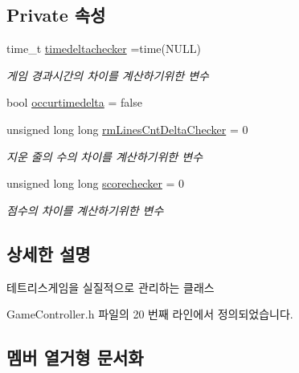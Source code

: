 \subsection*{Private 속성}
\begin{DoxyCompactItemize}
\item 
time\+\_\+t \hyperlink{class_tetris_1_1_game_controller_a41b29ef9d04dcdc824e144a8a2cab543}{timedeltachecker} =time(N\+U\+LL)
\begin{DoxyCompactList}\small\item\em 게임 경과시간의 차이를 계산하기위한 변수 \end{DoxyCompactList}\item 
bool \hyperlink{class_tetris_1_1_game_controller_ac98e5fa60bd5bc9bb2e2c5210148f2cc}{occurtimedelta} = false
\item 
unsigned long long \hyperlink{class_tetris_1_1_game_controller_a090fe0dc93a5f3579714346c4ba39bcd}{rm\+Lines\+Cnt\+Delta\+Checker} = 0
\begin{DoxyCompactList}\small\item\em 지운 줄의 수의 차이를 계산하기위한 변수 \end{DoxyCompactList}\item 
unsigned long long \hyperlink{class_tetris_1_1_game_controller_a2982c5246ef73b6c9affa6d25d575982}{scorechecker} = 0
\begin{DoxyCompactList}\small\item\em 점수의 차이를 계산하기위한 변수 \end{DoxyCompactList}\end{DoxyCompactItemize}


\subsection{상세한 설명}
테트리스게임을 실질적으로 관리하는 클래스 

Game\+Controller.\+h 파일의 20 번째 라인에서 정의되었습니다.



\subsection{멤버 열거형 문서화}
\mbox{\label{class_tetris_1_1_game_controller_a96a963b56385f3b3a122ff0ca2beb770}} 
